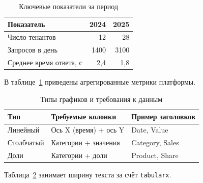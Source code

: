 \begin{table}[H]
  \centering
  \caption{Ключевые показатели за период}
  \label{tab:kpi}
  \begin{tabular}{lrr}
    \toprule
    Показатель & 2024 & 2025 \\
    \midrule
    Число тенантов & 12 & 28 \\
    Запросов в день & 1400 & 3100 \\
    Среднее время ответа, с & 2{,}4 & 1{,}8 \\
    \bottomrule
  \end{tabular}
\end{table}

В таблице~\ref{tab:kpi} приведены агрегированные метрики платформы.

\begin{table}[H]
  \centering
  \caption{Типы графиков и требования к данным}
  \label{tab:chart_types}
  \begin{tabularx}{\textwidth}{lXX}
    \toprule
    Тип & Требуемые колонки & Пример заголовков \\
    \midrule
    Линейный & Ось X (время) + ось Y & Date, Value \\
    Столбчатый & Категории + значения & Category, Sales \\
    Доли & Категории + доли & Product, Share \\
    \bottomrule
  \end{tabularx}
\end{table}

Таблица~\ref{tab:chart_types} занимает ширину текста за счёт \texttt{tabularx}.
